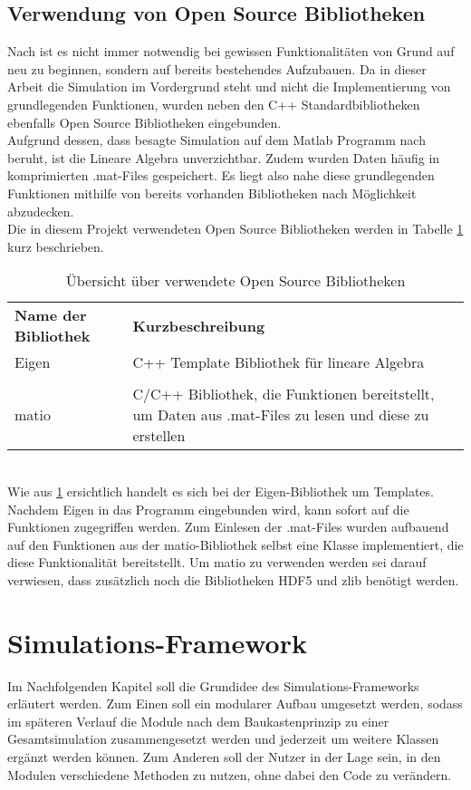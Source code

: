 \section{Verwendung von Open Source Bibliotheken}
\label{sec:OSBib}
Nach  \cite{Kessler.Wintersemester201718}  ist es nicht immer notwendig bei gewissen Funktionalitäten von Grund auf neu zu beginnen, sondern auf bereits bestehendes Aufzubauen.
Da in dieser Arbeit die Simulation im Vordergrund steht und nicht die Implementierung von grundlegenden Funktionen, wurden neben den C++ Standardbibliotheken ebenfalls Open Source Bibliotheken eingebunden.\\ Aufgrund dessen, dass besagte Simulation auf dem Matlab Programm nach \cite{Olucak.15.02.2017} beruht, ist die Lineare Algebra unverzichtbar. Zudem wurden Daten häufig in komprimierten .mat-Files gespeichert. Es liegt also nahe diese grundlegenden Funktionen mithilfe von bereits vorhanden Bibliotheken nach Möglichkeit abzudecken.
\\Die in diesem Projekt verwendeten Open Source Bibliotheken werden in Tabelle \ref{tab:openSource} kurz beschrieben.
\begin{table}[h]
	\centering	\begin{tabular}{l p{10cm}}
		\textbf{Name der Bibliothek} & \textbf{Kurzbeschreibung}\\
		Eigen &  C++ Template Bibliothek für lineare Algebra \cite{TuxFamily.2018}\\\\
		matio & C/C++ Bibliothek, die Funktionen bereitstellt, um Daten aus .mat-Files zu lesen und diese zu erstellen \cite{Hulbert.2013}
	\end{tabular}
	\caption{Übersicht über verwendete Open Source Bibliotheken}
	\label{tab:openSource}
\end{table}\\
Wie aus \ref{tab:openSource} ersichtlich handelt es sich bei der Eigen-Bibliothek um Templates. Nachdem Eigen in das Programm eingebunden wird, kann sofort auf die Funktionen zugegriffen werden. Zum Einlesen der .mat-Files wurden aufbauend auf den  Funktionen aus der matio-Bibliothek selbst eine Klasse implementiert, die diese Funktionalität bereitstellt. Um matio zu verwenden werden sei darauf verwiesen, dass zusätzlich noch die Bibliotheken HDF5 \cite{HDFGroup.2018} und zlib \cite{Roelofs.2018} benötigt werden. 



\chapter{Simulations-Framework}
\label{ch:Simulations-Framework}
Im Nachfolgenden Kapitel soll die Grundidee des Simulations-Frameworks erläutert werden. Zum Einen soll ein modularer Aufbau umgesetzt werden, sodass im späteren Verlauf die Module nach dem Baukastenprinzip zu einer Gesamtsimulation zusammengesetzt werden und jederzeit um weitere Klassen ergänzt werden können. Zum Anderen soll der Nutzer in der Lage sein, in den Modulen verschiedene Methoden zu nutzen, ohne dabei den Code zu verändern.
